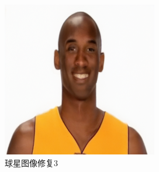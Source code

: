 \begin{figure}[H]
\begin{minipage}[b]{0.3\linewidth}
  \end{minipage}
\hspace{0.1cm}
  \begin{minipage}[b]{0.3\linewidth}
    \includegraphics[width=\linewidth]{Picture/recon/mamba_recon.png}
  \end{minipage}
  \caption{球星图像修复3}
\end{figure}
